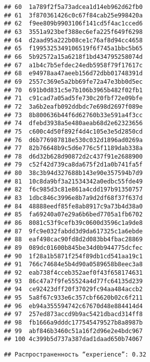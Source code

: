 \documentclass[
]{article}
\newenvironment{Shaded}{\begin{snugshade}}{\end{snugshade}}
\newcommand{\CommentTok}[1]{\textcolor[rgb]{0.56,0.35,0.01}{\textit{#1}}}
\newcommand{\DecValTok}[1]{\textcolor[rgb]{0.00,0.00,0.81}{#1}}
\newcommand{\FunctionTok}[1]{\textcolor[rgb]{0.13,0.29,0.53}{\textbf{#1}}}
\newcommand{\NormalTok}[1]{#1}
\newcommand{\OtherTok}[1]{\textcolor[rgb]{0.56,0.35,0.01}{#1}}
\newcommand{\SpecialCharTok}[1]{\textcolor[rgb]{0.81,0.36,0.00}{\textbf{#1}}}
\newcommand{\StringTok}[1]{\textcolor[rgb]{0.31,0.60,0.02}{#1}}
\begin{document}
\begin{verbatim}
## 60  1a789f2f5a73adcea1d14eb962d62fb0
## 61  3f870361426c0c67f84cab25e998420a
## 62  f9ee809b9903106f141cd5f4ac1cced6
## 63  3551a923bef388ec6efa225f649f6298
## 64  d2aad95a222b08ce1c76af8d94cc4658
## 65  f1995325349106519f6f745a1bbc5b65
## 66  5b92572a15a6218f1bd434795258074d
## 67  a1b4c7b5efdec24edb5958f79f17617c
## 68  e94978aa47aeeb156d72dbb01748391d
## 69  2557c369e5a2bb69fe72a47e3bb0d5ec
## 70  691b0d831c5e7b106b3965b482f02fb1
## 71  c91cad7a05ad5fe730c20fbf72e09bfe
## 72  3a6b2eafb092ddbdc7e698d2697f089e
## 73  8b800636b44f6d62760b33e591a4f3cc
## 74  dfebd3938a5e480aeab68d2e62323656
## 75  c600c4d50f892f4d4c105e3e5d2850cd
## 76  d6b776987818e530c032d1896ad0269a
## 77  82b76648b9c5d6e776c5f1189dab338a
## 78  d6d32b628d90872d2c437f91e2688900
## 79  c52f42d739ca8da675f2d1a0b741fa5f
## 80  38c3b94d327688b143e90e357594b7d9
## 81  10c8da9bf3a21534342a0edbc55fde49
## 82  f6c985d3c81e861a4cdd197b91350757
## 83  1dbc846c3996e8b7a9d2df68f37f637d
## 84  48888eedf85fe8ab8917c9a73b4d38a0
## 85  fa69240a07e29a6b6bed7705a1fb6702
## 86  8081c53f9cefb39c0600d3596c1a9de8
## 87  9fc9e032fabdd3d9da617325c1a6ebde
## 88  eaf498cac90fd8d2d083bb4fbac28869
## 89  089dc01600b845be34d0b944775dcfec
## 90  1f28a1b5871f254f89db1cd541aa19c1
## 91  766c74684e5b4d90a0589658b8eec3a8
## 92  eab738f4cceb352aef0f43f658174631
## 93  86c47a7f9fe55524a4d77fc64135d239
## 94  ce92423dff20f37029fc94aa484accb2
## 95  5a8f67c933e6c357cbf6620b02c6f211
## 96  eb94a355594742c67670d48e884414d4
## 97  257ed873accd9b9ac5421dbacd314ff8
## 98  fb1666a9dddc177545479527b8a8987b
## 99  abf846b3460c51a16f2d96e2e4bdc967
## 100 4c399b5d737a387dad1daad650b74067
\end{verbatim}

\begin{Shaded}
\end{Shaded}

\begin{verbatim}
## Распространенность “experience”: 0.32
\end{verbatim}
\end{document}
